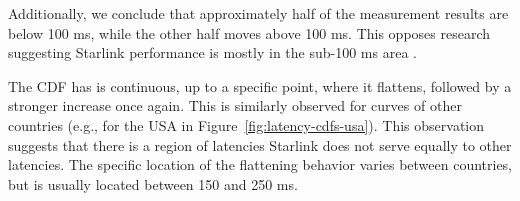 Additionally, we conclude that approximately half of the measurement results are below 100 ms, while the other half moves above 100 ms. This opposes research suggesting Starlink performance is mostly in the sub-100 ms area \cite{DBLP:conf/www/MohanFCBRMO24, DBLP:conf/icnp/LaiLL20, DBLP:journals/pacmnet/RamanVCSZ23, DBLP:conf/imc/MichelTGB22}.

The CDF has is continuous, up to a specific point, where it flattens, followed by a stronger increase once again. This is similarly observed for curves of other countries (e.g., for the USA in Figure~\ref{fig:latency-cdfs-usa}). This observation suggests that there is a region of latencies Starlink does not serve equally to other latencies. The specific location of the flattening behavior varies between countries, but is usually located between 150 and 250 ms.

